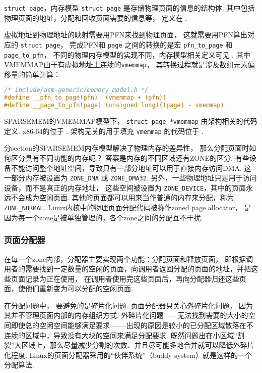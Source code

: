 \begin{readsrcbox}{\lstinline{struct page}，内存模型}
	\lstinline{struct page} 是存储物理页面的信息的结构体.
	其中包括物理页面的地址，分配和回收页面需要的信息等，
	定义在 .

	虚拟地址到物理地址的映射需要用PFN来找到物理页面，
	这就需要用PFN算出对应的 \lstinline{struct page}，
	完成PFN和 \lstinline{page} 之间的转换的是宏
	\lstinline{pfn_to_page} 和 \lstinline{page_to_pfn}，
	不同的物理内存模型的实现不同，内存模型相关定义可见
	.
	其中VMEMMAP由于有虚拟地址上连续的\lstinline{vmemmap}，
	其转换过程就是涉及数组元素偏移量的简单计算：
	\begin{lstlisting}[language=C]
/* include/asm-generic/memory_model.h */
#define __pfn_to_page(pfn)	(vmemmap + (pfn))
#define __page_to_pfn(page)	(unsigned long)((page) - vmemmap)
\end{lstlisting}

	SPARSEMEM的VMEMMAP模型下，
	\lstinline{struct page *vmemmap} 由架构相关的代码定义.
	x86-64的位于 .
	架构无关的用于填充 \lstinline{vmemmap} 的代码位于
	.
\end{readsrcbox}

分section的SPARSEMEM内存模型解决了物理内存的差异性，
那么分配页面时如何区分具有不同功能的内存呢？
答案是内存的不同区域还有ZONE的区分.
有些设备不能访问整个地址空间，导致只有一部分地址可以用于直接内存访问DMA.
这一部分内存被设置为 \lstinline{ZONE_DMA} 或 \lstinline{ZONE_DMA32}.
另外，一些物理地址只是用于访问设备，而不是真正的内存地址，
这些空间被设置为 \lstinline{ZONE_DEVICE}，其中的页面永远不会成为空闲页面.
其他的页面都可以用来当作普通的内存来分配，称为 \lstinline{ZONE_NORMAL}.
Linux内核中的物理页面分配代码被称作zoned page allocator，
是因为每一个zone是被单独管理的，各个zone之间的分配互不干扰.

\subsubsection{页面分配器}

在每一个zone内部，分配器主要实现两个功能：分配页面和释放页面，
即根据调用者的需要找到一定数量的空闲的页面，向调用者返回分配的页面的地址，并把这些页面记录为正在使用，
在调用者使用完这些页面后，再向分配器归还这些页面，使他们重新变为可以分配的空闲页面.

在分配问题\cite{silberschatz2021operating}中，
要避免的是碎片化问题.
页面分配器只关心外碎片化问题，
因为其并不管理页面内部的内存组织方式.
外碎片化问题——无法找到需要的大小的空间即使总的空闲空间能够满足要求\cite{silberschatz2021operating}
——出现的原因是较小的已分配区域散落在不连续的区域中，导致没有大块的空间来满足分配要求.
既然问题出在小区域“割裂”大区域上，那么尽量减少分割的次数、并且尽可能多地合并就可以降低外碎片化程度.
Linux的页面分配器采用的“伙伴系统”（buddy system）就是这样的一个分配算法.


